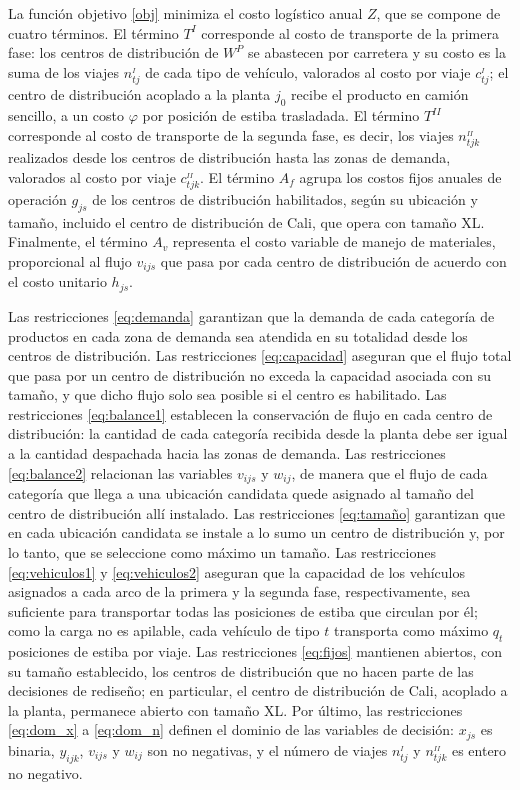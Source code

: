 \documentclass[fleqn, 11pt,letterpaper]{article}
\begin{document}
\vspace{5mm}
La función objetivo \eqref{obj} minimiza el costo logístico anual $Z$, que se compone de cuatro términos. El término $T^{I}$ corresponde al costo de transporte de la primera fase: los centros de distribución de $W^{P}$ se abastecen por carretera y su costo es la suma de los viajes $n^{_I}_{tj}$ de cada tipo de vehículo, valorados al costo por viaje $c^{_I}_{tj}$; el centro de distribución acoplado a la planta $j_0$ recibe el producto en camión sencillo, a un costo $\varphi$ por posición de estiba trasladada. El término $T^{II}$ corresponde al costo de transporte de la segunda fase, es decir, los viajes $n^{_{II}}_{tjk}$ realizados desde los centros de distribución hasta las zonas de demanda, valorados al costo por viaje $c^{_{II}}_{tjk}$. El término $A_{f}$ agrupa los costos fijos anuales de operación $g_{js}$ de los centros de distribución habilitados, según su ubicación y tamaño, incluido el centro de distribución de Cali, que opera con tamaño XL. Finalmente, el término $A_{v}$ representa el costo variable de manejo de materiales, proporcional al flujo $v_{ijs}$ que pasa por cada centro de distribución de acuerdo con el costo unitario $h_{js}$.

Las restricciones \eqref{eq:demanda} garantizan que la demanda de cada categoría de productos en cada zona de demanda sea atendida en su totalidad desde los centros de distribución. Las restricciones \eqref{eq:capacidad} aseguran que el flujo total que pasa por un centro de distribución no exceda la capacidad asociada con su tamaño, y que dicho flujo solo sea posible si el centro es habilitado. Las restricciones \eqref{eq:balance1} establecen la conservación de flujo en cada centro de distribución: la cantidad de cada categoría recibida desde la planta debe ser igual a la cantidad despachada hacia las zonas de demanda. Las restricciones \eqref{eq:balance2} relacionan las variables $v_{ijs}$ y $w_{ij}$, de manera que el flujo de cada categoría que llega a una ubicación candidata quede asignado al tamaño del centro de distribución allí instalado. Las restricciones \eqref{eq:tamaño} garantizan que en cada ubicación candidata se instale a lo sumo un centro de distribución y, por lo tanto, que se seleccione como máximo un tamaño. Las restricciones \eqref{eq:vehiculos1} y \eqref{eq:vehiculos2} aseguran que la capacidad de los vehículos asignados a cada arco de la primera y la segunda fase, respectivamente, sea suficiente para transportar todas las posiciones de estiba que circulan por él; como la carga no es apilable, cada vehículo de tipo $t$ transporta como máximo $q_t$ posiciones de estiba por viaje. Las restricciones \eqref{eq:fijos} mantienen abiertos, con su tamaño establecido, los centros de distribución que no hacen parte de las decisiones de rediseño; en particular, el centro de distribución de Cali, acoplado a la planta, permanece abierto con tamaño XL. Por último, las restricciones \eqref{eq:dom_x} a \eqref{eq:dom_n} definen el dominio de las variables de decisión: $x_{js}$ es binaria, $y_{ijk}$, $v_{ijs}$ y $w_{ij}$ son no negativas, y el número de viajes $n^{_I}_{tj}$ y $n^{_{II}}_{tjk}$ es entero no negativo.
\end{document}
